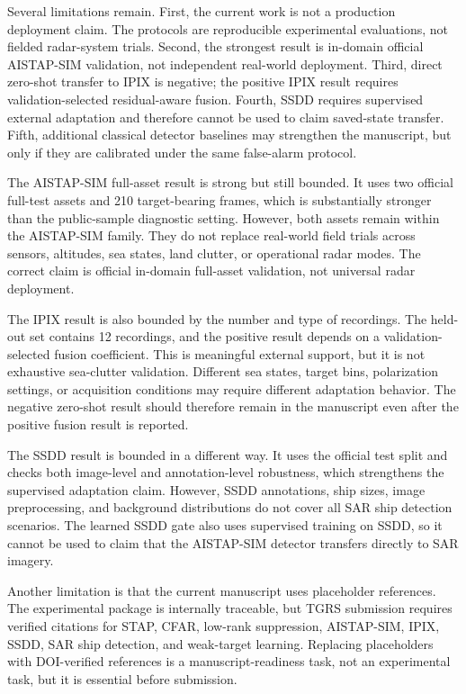 \documentclass[journal]{IEEEtran}
\begin{document}
Several limitations remain. First, the current work is not a production deployment claim. The protocols are reproducible experimental evaluations, not fielded radar-system trials. Second, the strongest result is in-domain official AISTAP-SIM validation, not independent real-world deployment. Third, direct zero-shot transfer to IPIX is negative; the positive IPIX result requires validation-selected residual-aware fusion. Fourth, SSDD requires supervised external adaptation and therefore cannot be used to claim saved-state transfer. Fifth, additional classical detector baselines may strengthen the manuscript, but only if they are calibrated under the same false-alarm protocol.

The AISTAP-SIM full-asset result is strong but still bounded. It uses two official full-test assets and 210 target-bearing frames, which is substantially stronger than the public-sample diagnostic setting. However, both assets remain within the AISTAP-SIM family. They do not replace real-world field trials across sensors, altitudes, sea states, land clutter, or operational radar modes. The correct claim is official in-domain full-asset validation, not universal radar deployment.

The IPIX result is also bounded by the number and type of recordings. The held-out set contains 12 recordings, and the positive result depends on a validation-selected fusion coefficient. This is meaningful external support, but it is not exhaustive sea-clutter validation. Different sea states, target bins, polarization settings, or acquisition conditions may require different adaptation behavior. The negative zero-shot result should therefore remain in the manuscript even after the positive fusion result is reported.

The SSDD result is bounded in a different way. It uses the official test split and checks both image-level and annotation-level robustness, which strengthens the supervised adaptation claim. However, SSDD annotations, ship sizes, image preprocessing, and background distributions do not cover all SAR ship detection scenarios. The learned SSDD gate also uses supervised training on SSDD, so it cannot be used to claim that the AISTAP-SIM detector transfers directly to SAR imagery.

Another limitation is that the current manuscript uses placeholder references. The experimental package is internally traceable, but TGRS submission requires verified citations for STAP, CFAR, low-rank suppression, AISTAP-SIM, IPIX, SSDD, SAR ship detection, and weak-target learning. Replacing placeholders with DOI-verified references is a manuscript-readiness task, not an experimental task, but it is essential before submission.
\end{document}
